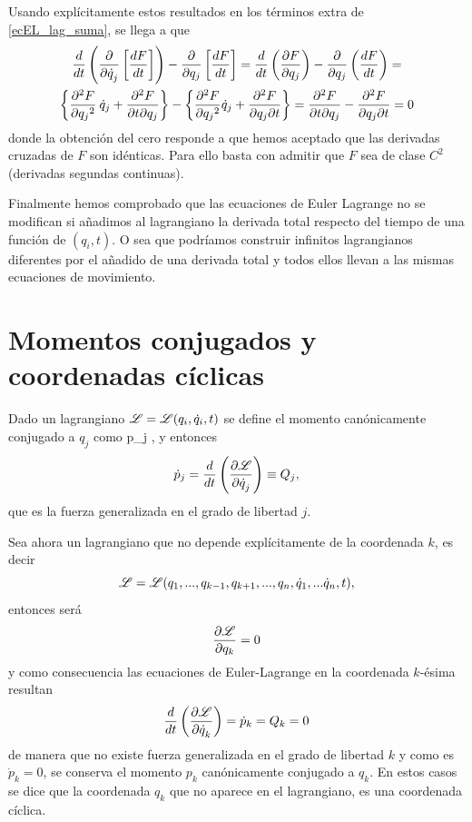 \documentclass[10pt,oneside]{CBFT_book}
\begin{document}
Usando explícitamente estos resultados en los términos extra de \eqref{ecEL_lag_suma}, se llega 
a que 
\begin{multline*}
 	\dtot{}{t}\left(\dpar{}{\dot{q}_j}\left[ \dtot{F}{t} \right]\right) 
	- \dpar{}{q_j}\left[ \dtot{F}{t}\right] =
	\dtot{}{t}\left( \dpar{F}{q_j} \right) - \dpar{}{q_j}\left( \dtot{F}{t}\right) = \\
	\left\{ \dpar[2]{F}{q_j} \: \dot{q}_j + \dparcru{F}{q_j}{t} \right\}%
	- \left\{ \dpar[2]{F}{q_j} \dot{q}_j + \dparcru{F}{t}{q_j} \right\} =
	\dparcru{F}{q_j}{t} - \dparcru{F}{t}{q_j} = 0
\end{multline*}
donde la obtención del cero responde a que hemos aceptado que las derivadas cruzadas de $F$ son idénticas.
Para ello basta con admitir que $F$ sea de clase $C^2$ (derivadas segundas continuas).

Finalmente hemos comprobado que las ecuaciones de Euler Lagrange no se modifican si añadimos al lagrangiano la 
derivada total respecto del tiempo de una función de $(q_i,t)$.
O sea que podríamos construir infinitos lagrangianos diferentes por el añadido de una derivada total y todos
ellos llevan a las mismas ecuaciones de movimiento.

\section{Momentos conjugados y coordenadas cíclicas}

Dado un lagrangiano $\mathscr{L} = \mathscr{L}( q_i,\dot{q}_i, t )$ se define el momento canónicamente conjugado a $q_j$
como 
\be
	p_j \equiv {},
	\label{mom_canon_conj}
\ee
y entonces 
\[
	\dot{p}_j = \frac{d}{dt}\left( \frac{\partial^{\hspace{-0.05em}} {\mathscr{L}}}{\partial {\dot{q}_j}^{\hspace{-0.05em}}} \right) \equiv Q_j,
\]
que es la fuerza generalizada en el grado de libertad $j$.

Sea ahora un lagrangiano que no depende explícitamente de la coordenada $k$, es decir 
\[
	\mathscr{L} = \mathscr{L}( q_1,...,q_{k-1},q_{k+1},...,q_n,\dot{q}_1,...\dot{q}_n, t ),
\]
entonces será
\[
	\frac{\partial^{\hspace{-0.05em}} {\mathscr{L}}}{\partial {q_k}^{\hspace{-0.05em}}}= 0 
\]
y como consecuencia las ecuaciones de Euler-Lagrange en la coordenada $k$-ésima resultan 
\[
	\frac{d^{\hspace{-0.05em}} {}}{d {t}^{\hspace{-0.05em}}}\left( \frac{\partial^{\hspace{-0.05em}} {\mathscr{L}}}{\partial {\dot{q}_k}^{\hspace{-0.05em}}} \right) = \dot{ p }_k = Q_k = 0 
\]
de manera que no existe fuerza generalizada en el grado de libertad $k$ y como es $\dot{p}_k = 0$, se conserva 
el momento $p_k$ canónicamente conjugado a $q_k$.
En estos casos se dice que la coordenada $q_k$ que no aparece en el lagrangiano, es una coordenada
cíclica.
\end{document}
